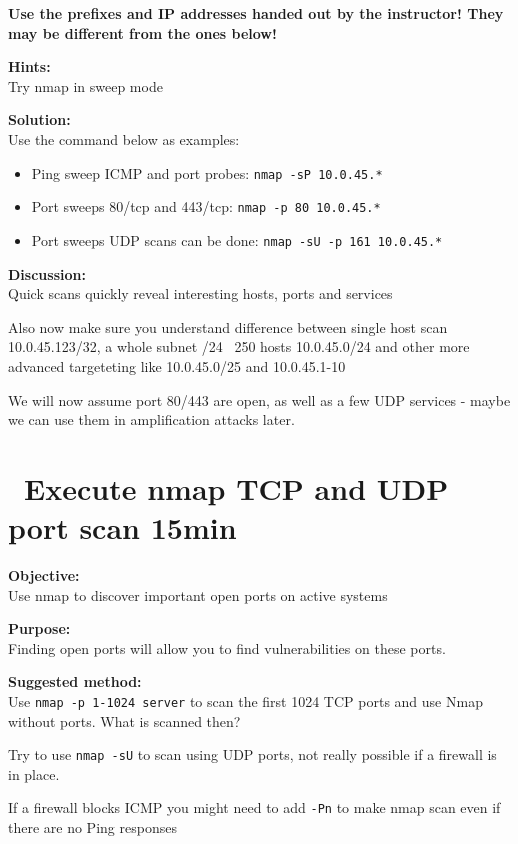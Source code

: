 \documentclass[a4paper,11pt,notitlepage]{report}
\begin{document}
{\bf Use the prefixes and IP addresses handed out by the instructor! They may be different from the ones below!}

{\bf Hints:} \\
Try nmap in sweep mode

{\bf Solution:}\\
Use the command below as examples:
\begin{itemize}
\item Ping sweep ICMP and port probes: \verb+nmap -sP 10.0.45.*+
\item Port sweeps 80/tcp and 443/tcp: \verb+nmap -p 80 10.0.45.*+
\item Port sweeps UDP scans can be done: \verb+nmap -sU -p 161 10.0.45.*+
\end{itemize}

{\bf Discussion:}\\
Quick scans quickly reveal interesting hosts, ports and services

Also now make sure you understand difference between single host scan
10.0.45.123/32, a whole subnet /24 ~250 hosts 10.0.45.0/24 and other more advanced targeteting like 10.0.45.0/25 and 10.0.45.1-10

We will now assume port 80/443 are open, as well as a few UDP services - maybe we can use them in amplification attacks later.


\chapter{\faExclamationTriangle\ Execute nmap TCP and UDP port scan 15min}
\label{ex:nmap-synscan}


{\bf Objective:} \\
Use nmap to discover important open ports on active systems

{\bf Purpose:}\\
Finding open ports will allow you to find vulnerabilities on these ports.

{\bf Suggested method:}\\
Use \verb+nmap -p 1-1024 server+ to scan the first 1024 TCP
ports and use Nmap without ports. What is scanned then?

Try to use \verb+nmap -sU+ to scan using UDP ports, not really possible if a firewall is in place.

If a firewall blocks ICMP you might need to add \verb+-Pn+ to make nmap scan even if there are no Ping responses
\end{document}
